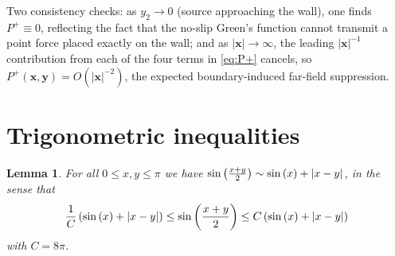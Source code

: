 \documentclass{amsart}
\newcommand{\mx}{\mathbf{x}}
\newcommand{\my}{\mathbf{y}}
\newtheorem{lemma}[theorem]{Lemma}
\begin{document}
Two consistency checks: as $y_2\to 0$ (source approaching the wall), one
finds $P^+\equiv 0$, reflecting the fact that the no-slip Green's function
cannot transmit a point force placed exactly on the wall; and as
$|\mx|\to\infty$, the leading $|\mx|^{-1}$ contribution from each of the
four terms in \eqref{eq:P+} cancels, so $P^+(\mx,\my) = O(|\mx|^{-2})$,
the expected boundary-induced far-field suppression.
 



\section{Trigonometric inequalities}


\begin{lemma} \label{lem:sinequiv}
For all $0 \leq x,y \leq \pi$ we have $\sin\left( {x+y \over 2}\right) \sim  \sin\left( x \right)+ |x-y| $,  in the sense that 
\[
{1\over C}\left( \sin\left(x\right) + |x-y| \right) \leq \sin \left( {x+y \over 2}\right) \leq C \left( \sin\left( x \right)+ |x-y| \right)
\]
with $C = 8\pi$.
\end{lemma}
\end{document}
